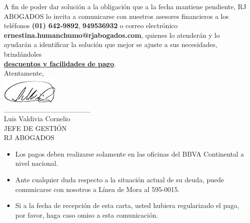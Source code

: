 \noindent
A fin de poder dar solución a la obligación que a la fecha mantiene pendiente, RJ ABOGADOS lo invita a comunicarse con nuestros asesores financieros a los teléfonos \textbf{(01) 642-9892}, \textbf{949536932} o correo electrónico \textbf{ernestina.humanchumo@rjabogados.com}, quienes lo atenderán y lo ayudarán a identificar la solución que mejor se ajuste a sus necesidades, brindándoles\\ \textbf{\underline{\large descuentos y facilidades de pago}}.\\

\noindent Atentamente,\\
\includegraphics[natwidth=2.831041667cm, natheight=1.322916667cm]{resources/lawyer_signature.png}\\
\_\_\_\_\_\_\_\_\_\_\_\_\_\_\_\_\_\\
{\small Luis Valdivia Cornelio\\
JEFE DE GESTIÓN\\
RJ ABOGADOS}\\

\vspace{1cm}
\begin{itemize}
  \item {\footnotesize Los pagos deben realizarse solamente en las oficinas del BBVA Continental a nivel nacional.}
  \item {\footnotesize Ante cualquier duda respecto a la situación actual de su deuda, puede comunicarse con nosotros a Línea de Mora al 595-0015.}
  \item {\footnotesize Si a la fecha de recepción de esta carta, usted hubiera regularizado el pago, por favor, haga caso omiso a esta comunicación.}
\end{itemize}